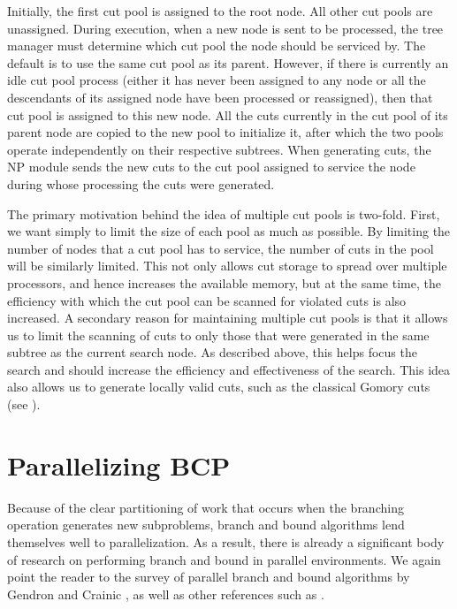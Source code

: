 Initially, the first cut pool is assigned to the root node. All other cut
pools are unassigned. During execution, when a new node is sent to be
processed, the tree manager must determine which cut pool the node should be
serviced by. The default is to use the same cut pool as its parent. However,
if there is currently an idle cut pool process (either it has never been
assigned to any node or all the descendants of its assigned node have been
processed or reassigned), then that cut pool is assigned to this new node. All
the cuts currently in the cut pool of its parent node are copied to the new
pool to initialize it, after which the two pools operate independently on
their respective subtrees. When generating cuts, the NP module sends the new
cuts to the cut pool assigned to service the node during whose processing the
cuts were generated.

The primary motivation behind the idea of multiple cut pools is
two-fold. First, we want simply to limit the size of each pool as
much as possible. By limiting the number of nodes that a cut pool has
to service, the number of cuts in the pool will be similarly limited.
This not only allows cut storage to spread over multiple processors,
and hence increases the available memory, but at the same time, the
efficiency with which the cut pool can be scanned for violated cuts is
also increased. A secondary reason for maintaining multiple cut pools is
that it allows us to limit the scanning of cuts to only those that
were generated in the same subtree as the current search node. As
described above, this helps focus the search and should increase the
efficiency and effectiveness of the search. This idea also
allows us to generate locally valid cuts, such as the classical
Gomory cuts (see \cite{nemwol88}).

\section{Parallelizing BCP}
\label{parallelizing}

Because of the clear partitioning of work that occurs when the
branching operation generates new subproblems, branch and bound
algorithms lend themselves well to parallelization. As a result, there
is already a significant body of research on performing branch and
bound in parallel environments. We again point the reader to the
survey of parallel branch and bound algorithms by Gendron and Crainic
\cite{gend:paral}, as well as other references such as
\cite{PICO,GraKum99,kuma:para4,kuma:para3}.

